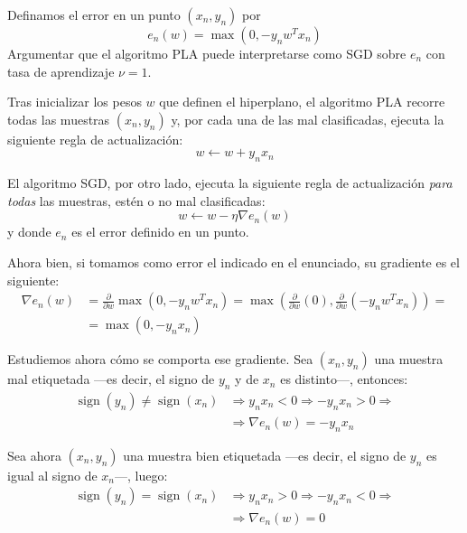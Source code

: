 \documentclass[a4paper, 11pt]{article}
\begin{document}
      \begin{ejercicio}
        Definamos el error en un punto $(x_n,y_n)$ por
          \[
          e_n(w)=\max(0,-y_nw^Tx_n)
          \]
          Argumentar que el algoritmo PLA puede interpretarse como SGD sobre $e_n$ con tasa de aprendizaje $\nu=1$.
      \end{ejercicio}

      \begin{solucion}
        Tras inicializar los pesos $w$ que definen el hiperplano, el algoritmo PLA recorre todas las muestras $(x_n, y_n)$ y, por cada una de las mal clasificadas, ejecuta la siguiente regla de actualización:
        \[
        w \gets w + y_nx_n
        \]

        El algoritmo SGD, por otro lado, ejecuta la siguiente regla de actualización \emph{para todas} las muestras, estén o no mal clasificadas:
        \[
        w \gets w - \eta \nabla e_n(w)
        \]
        y donde $e_n$ es el error definido en un punto.

        Ahora bien, si tomamos como error el indicado en el enunciado, su gradiente es el siguiente:
        \begin{align*}
            \nabla e_n(w) &= \frac{\partial}{\partial w} \max(0,-y_nw^Tx_n) = \max(\frac{\partial}{\partial w}(0), \frac{\partial}{\partial w} (-y_nw^Tx_n)) = \\
            &= \max(0, -y_n x_n)
        \end{align*}

        Estudiemos ahora cómo se comporta ese gradiente. Sea $(x_n, y_n)$ una muestra mal etiquetada ---es decir, el signo de $y_n$ y de $x_n$ es distinto---, entonces:
        \begin{align*}
            \operatorname{sign}(y_n) \neq \operatorname{sign}(x_n) &\Rightarrow y_n x_n < 0 \Rightarrow - y_n x_n > 0 \Rightarrow  \\
            &\Rightarrow \nabla e_n(w) = - y_n x_n
        \end{align*}

        Sea ahora $(x_n, y_n)$ una muestra bien etiquetada ---es decir, el signo de $y_n$ es igual al signo de $x_n$---, luego:
        \begin{align*}
            \operatorname{sign}(y_n) = \operatorname{sign}(x_n) &\Rightarrow y_n x_n > 0 \Rightarrow - y_n x_n < 0 \Rightarrow  \\
            &\Rightarrow \nabla e_n(w) = 0
        \end{align*}


\end{solucion}
\end{document}
